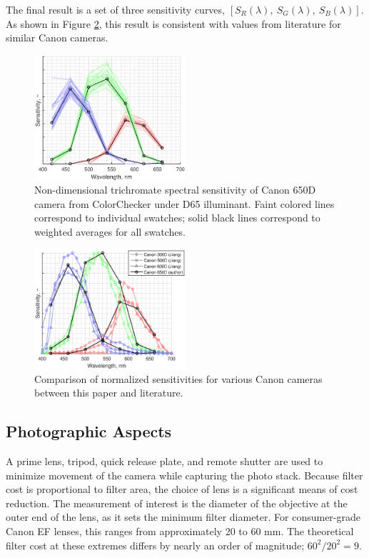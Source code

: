\documentclass[twocolumn,10pt]{asme2ej}
\newcommand{\id}{\hspace{6 mm}}
\begin{document}
\id The final result is a set of three sensitivity curves, $\left[ S_R(\lambda), \ S_G(\lambda), \ S_B(\lambda) \right]$. As shown in Figure \ref{camera_spectral_sensitivities}, this result is consistent with values from literature for similar Canon cameras. \cite{Jiang}

\begin{figure}
\centering
\includegraphics[width=0.5\textwidth]{canon_650d_sensitivity.eps}
\caption{Non-dimensional trichromate spectral sensitivity of Canon 650D camera from ColorChecker under D65 illuminant. Faint colored lines correspond to individual swatches; solid black lines correspond to weighted averages for all swatches.}
\label{canon_650d_sensitivity}
\end{figure}

\begin{figure}
\centering
\includegraphics[width=0.5\textwidth]{camera_spectral_sensitivities.eps}
\caption{Comparison of normalized sensitivities for various Canon cameras between this paper and literature. \cite{Jiang}}
\label{camera_spectral_sensitivities}
\end{figure}

\subsection{Photographic Aspects}
\label{photographic}

A prime lens, tripod, quick release plate, and remote shutter are used to minimize movement of the camera while capturing the photo stack. Because filter cost is proportional to filter area, the choice of lens is a significant means of cost reduction. The measurement of interest is the diameter of the objective at the outer end of the lens, as it sets the minimum filter diameter. For consumer-grade Canon EF lenses, this ranges from approximately 20 to 60 mm. The theoretical filter cost at these extremes differs by nearly an order of magnitude; $60^2 / 20^2 = 9$.
\end{document}
